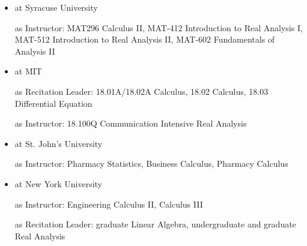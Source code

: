 \documentclass[12pt]{article}
\theoremstyle{plain} \numberwithin{equation}{section}
\theoremstyle{definition}
\begin{document}
\begin{itemize}
\item at Syracuse University

as Instructor: MAT296 Calculus II, MAT-412 Introduction to Real Analysis I, MAT-512 Introduction to Real Analysis II, MAT-602 Fundamentals of Analysis II
\item at MIT
	
	as Recitation Leader: 18.01A/18.02A Calculus, 18.02 Calculus, 18.03 Differential Equation
	
	as Instructor: 18.100Q Communication Intensive Real Analysis
	
\item at St. John's University
	
	as Instructor: Pharmacy Statistics, Business Calculus, Pharmacy Calculus
	
\item at New York University

	as Instructor: Engineering Calculus II, Calculus III
	
	as Recitation Leader:  graduate Linear Algebra, undergraduate and graduate Real Analysis 
\end{itemize}
 
\end{document}
